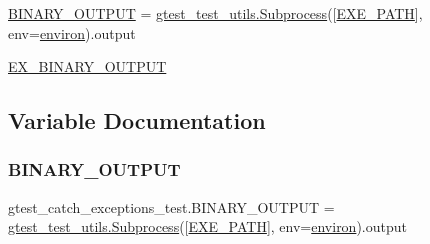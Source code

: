 \begin{DoxyCompactItemize}
\item 
\hyperlink{namespacegtest__catch__exceptions__test_a27d8da05609f357df39614cd41516993}{B\+I\+N\+A\+R\+Y\+\_\+\+O\+U\+T\+P\+UT} = \hyperlink{classgtest__test__utils_1_1_subprocess}{gtest\+\_\+test\+\_\+utils.\+Subprocess}(\mbox{[}\hyperlink{namespacegtest__catch__exceptions__test_a164e7815d55b13a811ce60e2e6f9448d}{E\+X\+E\+\_\+\+P\+A\+TH}\mbox{]}, env=\hyperlink{namespacegtest__catch__exceptions__test_ae51b794c28e667016c180f1b3fc85292}{environ}).output
\item 
\hyperlink{namespacegtest__catch__exceptions__test_a012f2b0e05fd56aa6817595da940c891}{E\+X\+\_\+\+B\+I\+N\+A\+R\+Y\+\_\+\+O\+U\+T\+P\+UT}
\end{DoxyCompactItemize}


\subsection{Variable Documentation}
\mbox{\label{namespacegtest__catch__exceptions__test_a27d8da05609f357df39614cd41516993}} 
\subsubsection{\texorpdfstring{B\+I\+N\+A\+R\+Y\+\_\+\+O\+U\+T\+P\+UT}{BINARY\_OUTPUT}}
{\footnotesize\ttfamily gtest\+\_\+catch\+\_\+exceptions\+\_\+test.\+B\+I\+N\+A\+R\+Y\+\_\+\+O\+U\+T\+P\+UT = \hyperlink{classgtest__test__utils_1_1_subprocess}{gtest\+\_\+test\+\_\+utils.\+Subprocess}(\mbox{[}\hyperlink{namespacegtest__catch__exceptions__test_a164e7815d55b13a811ce60e2e6f9448d}{E\+X\+E\+\_\+\+P\+A\+TH}\mbox{]}, env=\hyperlink{namespacegtest__catch__exceptions__test_ae51b794c28e667016c180f1b3fc85292}{environ}).output}

\mbox{\label{namespacegtest__catch__exceptions__test_ae51b794c28e667016c180f1b3fc85292}} 
